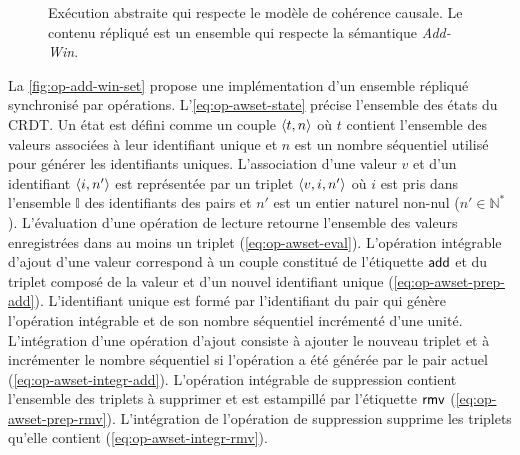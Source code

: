 \begin{figure}[tbh]
\centering
{}
\caption{Exécution abstraite qui respecte le modèle de cohérence causale.
Le contenu répliqué est un ensemble qui respecte la sémantique \emph{Add-Win}.}\label{fig:awset-example}
\end{figure}

La \autoref{fig:op-add-win-set} propose une implémentation d'un ensemble répliqué synchronisé par opérations.
L'\autoref{eq:op-awset-state} précise l'ensemble des états du \ac{CRDT}.
Un état est défini comme un couple $\tuple*{t, n}$ où $t$ contient l'ensemble des valeurs associées à leur identifiant unique et $n$ est un nombre séquentiel utilisé pour générer les identifiants uniques.
L'association d'une valeur $v$ et d'un identifiant $\tuple*{i, n'}$ est représentée par un triplet $\tuple*{v, i, n'}$ où $i$ est pris dans l'ensemble $\mathbb{I}$ des identifiants des pairs et $n'$ est un entier naturel non-nul ($n' \in \mathbb{N}^*$).
L'évaluation d'une opération de lecture retourne l'ensemble des valeurs enregistrées dans au moins un triplet (\autoref{eq:op-awset-eval}).
L'opération intégrable d'ajout d'une valeur correspond à un couple constitué de l'étiquette $\trm{add}$ et du triplet composé de la valeur et d'un nouvel identifiant unique (\autoref{eq:op-awset-prep-add}).
L'identifiant unique est formé par l'identifiant du pair qui génère l'opération intégrable et de son nombre séquentiel incrémenté d'une unité.
L'intégration d'une opération d'ajout consiste à ajouter le nouveau triplet et à incrémenter le nombre séquentiel si l'opération a été générée par le pair actuel (\autoref{eq:op-awset-integr-add}).
L'opération intégrable de suppression contient l'ensemble des triplets à supprimer et est estampillé par l'étiquette $\trm{rmv}$ (\autoref{eq:op-awset-prep-rmv}).
L'intégration de l'opération de suppression supprime les triplets qu'elle contient (\autoref{eq:op-awset-integr-rmv}).

